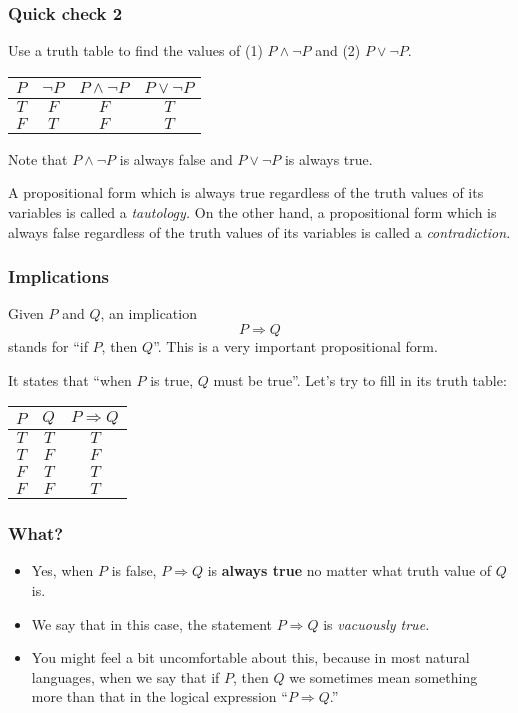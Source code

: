 \documentclass{beamer}
\begin{document}
\begin{frame}\frametitle{Quick check 2}
  Use a truth table to find the values of (1) $P\wedge \neg P$ and (2)
  $P\vee\neg P$.
  \pause

  \begin{tcolorbox}[title=And/Or/Not]
    \begin{tabular}{|c|c||c|c|}
      \hline
      $P$ & $\neg P$ & $P\wedge\neg P$ & $P\vee\neg P$\\
      \hline
      $T$ & $F$ & $F$ & $T$ \\
      $F$ & $T$ & $F$ & $T$ \\
      \hline
    \end{tabular}
  \end{tcolorbox}
  \pause

  Note that $P\wedge\neg P$ is always false and $P\vee\neg P$ is always true.

  A propositional form which is always true regardless of the truth
  values of its variables is called a {\em tautology.}  On the other
  hand, a propositional form which is always false regardless of the
  truth values of its variables is called a {\em contradiction.}
\end{frame}

\begin{frame}\frametitle{Implications}
  Given $P$ and $Q$, an implication
  \[P\Rightarrow Q\]
  stands for ``if $P$, then $Q$''.  This is a very important
  propositional form.

  It states that ``when $P$ is true, $Q$ must be true''.  Let's try to
  fill in its truth table:

  \begin{tcolorbox}[title=Implications]
    \begin{tabular}{|c|c||c|}
      \hline
      $P$ & $Q$ & $P\Rightarrow Q$ \\
      \hline
      $T$ & $T$ & \pause $T$ \\
      $T$ & $F$ & \pause $F$ \\
      $F$ & $T$ & \pause $T$ \\
      $F$ & $F$ & \pause $T$ \\
      \hline
    \end{tabular}
  \end{tcolorbox}
\end{frame}

\begin{frame}\frametitle{What?}
  \begin{itemize}
  \item
    Yes, when $P$ is false, $P\Rightarrow Q$ is {\bf always true} no
    matter what truth value of $Q$ is. 

  \item We say that in this case, the statement $P\Rightarrow Q$ is
    {\em vacuously true.}
    \pause

  \item
    You might feel a bit uncomfortable about this, because in most
    natural languages, when we say that if $P$, then $Q$ we sometimes
    mean something more than that in the logical expression
    ``$P\Rightarrow Q$.''
  \end{itemize}
\end{frame}
\end{document}
